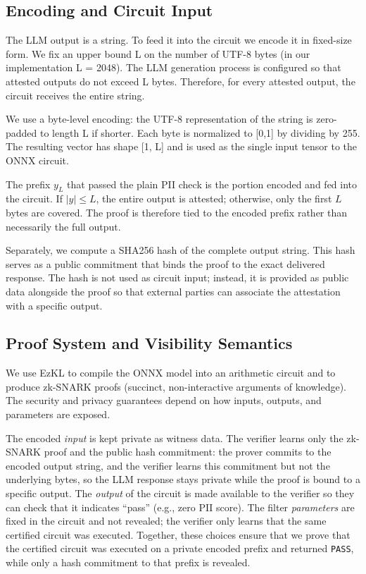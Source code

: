 \documentclass[10pt,conference,a4paper]{IEEEtran}
\begin{document}
\subsection{Encoding and Circuit Input}

The LLM output is a string. To feed it into the circuit we encode it in fixed-size form. We fix an upper bound L on the number of UTF-8 bytes (in our implementation L = 2048). The LLM generation process is configured so that attested outputs do not exceed L bytes. Therefore, for every attested output, the circuit receives the entire string.

We use a byte-level encoding: the UTF-8 representation of the string is zero-padded to length L if shorter. Each byte is normalized to [0,1] by dividing by 255. The resulting vector has shape [1, L] and is used as the single input tensor to the ONNX circuit.

The prefix $y_L$ that passed the plain PII check is the portion encoded and fed into the circuit. If $|y| \le L$, the entire output is attested; otherwise, only the first $L$ bytes are covered. The proof is therefore tied to the encoded prefix rather than necessarily the full output.

Separately, we compute a SHA256 hash of the complete output string. This hash serves as a public commitment that binds the proof to the exact delivered response. The hash is not used as circuit input; instead, it is provided as public data alongside the proof so that external parties can associate the attestation with a specific output.
\subsection{Proof System and Visibility Semantics}

We use EzKL to compile the ONNX model into an arithmetic circuit and to produce zk-SNARK proofs (succinct, non-interactive arguments of knowledge). The security and privacy guarantees depend on how inputs, outputs, and parameters are exposed.

The encoded \emph{input} is kept private as witness data. The verifier learns only the zk-SNARK proof and the public hash commitment: the prover commits to the encoded output string, and the verifier learns this commitment but not the underlying bytes, so the LLM response stays private while the proof is bound to a specific output. The \emph{output} of the circuit is made available to the verifier so they can check that it indicates ``pass'' (e.g., zero PII score). The filter \emph{parameters} are fixed in the circuit and not revealed; the verifier only learns that the same certified circuit was executed. Together, these choices ensure that we prove that the certified circuit was executed on a private encoded prefix and returned \texttt{PASS}, while only a hash commitment to that prefix is revealed.
\end{document}
